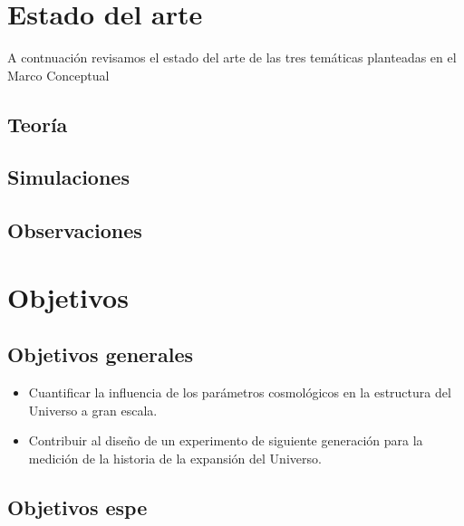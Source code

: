 \documentclass[12pt]{article}
\begin{document}
 


\section{Estado del arte}

A contnuaci\'on revisamos el estado del arte de las tres tem\'aticas
planteadas en el Marco Conceptual


\subsection{Teor\'ia}

\subsection{Simulaciones}

\subsection{Observaciones}

\section{Objetivos}

\subsection*{Objetivos generales} 

\begin{itemize}
\item  Cuantificar la influencia de los par\'ametros cosmol\'ogicos en la
  estructura del Universo a gran escala.
\item Contribuir al dise\~no de un experimento de siguiente
  generaci\'on para la medici\'on de la historia de la expansi\'on del
  Universo. 
\end{itemize}

\subsection{Objetivos espe}
\end{document}
